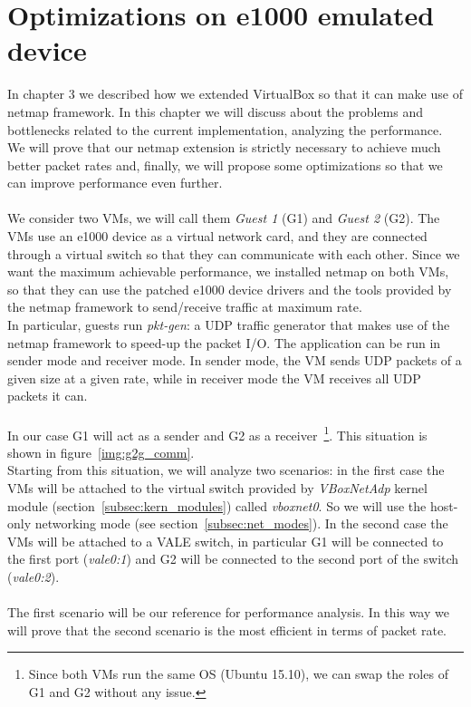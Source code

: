 \documentclass[a4paper, 12pt, titlepage]{report}
\begin{document}
\chapter{Optimizations on e1000 emulated device}
In chapter 3 we described how we extended VirtualBox so that it can make use of netmap framework. In this chapter we will discuss about the problems and bottlenecks related to the current implementation, analyzing the performance. We will prove that our netmap extension is strictly necessary to achieve much better packet rates and, finally, we will propose some optimizations so that we can improve performance even further. 
\\
\\
We consider two VMs, we will call them \textit{Guest 1} (G1) and \textit{Guest 2} (G2). The VMs use an e1000 device as a virtual network card, and they are connected through a virtual switch so that they can communicate with each other. Since we want the maximum achievable performance, we installed netmap on both VMs, so that they can use the patched e1000 device drivers and the tools provided by the netmap framework to send/receive traffic at maximum rate. 
\\
In particular, guests run \textit{pkt-gen}: a UDP traffic generator that makes use of the netmap framework to speed-up the packet I/O. The application can be run in sender mode and receiver mode. In sender mode, the VM sends UDP packets of a given size at a given rate, while in receiver mode the VM receives all UDP packets it can.
\\
\\
In our case G1 will act as a sender and G2 as a receiver~\footnote{Since both VMs run the same OS (Ubuntu 15.10), we can swap the roles of G1 and G2 without any issue.}. This situation is shown in figure~\ref{img:g2g_comm}.
\\
Starting from this situation, we will analyze two scenarios: in the first case the VMs will be attached to the virtual switch provided by \textit{VBoxNetAdp} kernel module (section~\ref{subsec:kern_modules}) called \textit{vboxnet0}. So we will use the host-only networking mode (see section~\ref{subsec:net_modes}). In the second case the VMs will be attached to a VALE switch, in particular G1 will be connected to the first port (\textit{vale0:1}) and G2 will be connected to the second port of the switch (\textit{vale0:2}).
\\
\\
The first scenario will be our reference for performance analysis. In this way we will prove that the second scenario is the most efficient in terms of packet rate.
\end{document}
